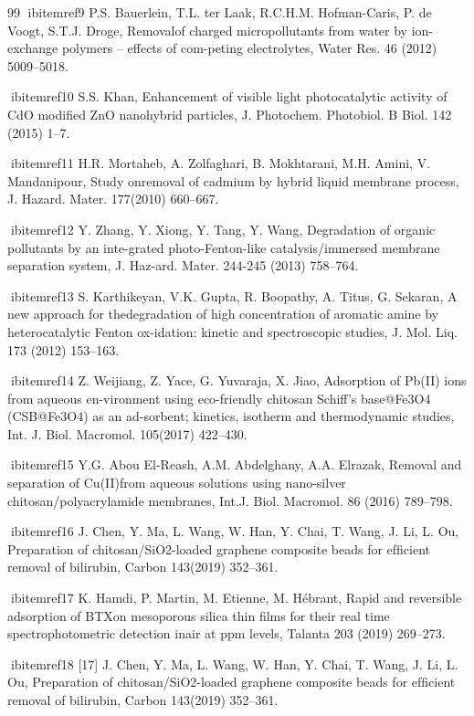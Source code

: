 \documentclass[final,5p,times,twocolumn,authoryear]{elsarticle}
\begin{document}
\begin{thebibliography}{99}
ibitem{ref9} P.S. Bauerlein, T.L. ter Laak, R.C.H.M. Hofman-Caris, P. de Voogt, S.T.J. Droge, Removalof charged micropollutants from water by ion-exchange polymers – effects of com-peting electrolytes, Water Res. 46 (2012) 5009–5018.

ibitem{ref10} S.S. Khan, Enhancement of visible light photocatalytic activity of CdO modiﬁed ZnO nanohybrid particles, J. Photochem. Photobiol. B Biol. 142 (2015) 1–7.

ibitem{ref11} H.R. Mortaheb, A. Zolfaghari, B. Mokhtarani, M.H. Amini, V. Mandanipour, Study onremoval of cadmium by hybrid liquid membrane process, J. Hazard. Mater. 177(2010) 660–667.

ibitem{ref12} Y. Zhang, Y. Xiong, Y. Tang, Y. Wang, Degradation of organic pollutants by an inte-grated photo-Fenton-like catalysis/immersed membrane separation system, J. Haz-ard. Mater. 244-245 (2013) 758–764.

ibitem{ref13} S. Karthikeyan, V.K. Gupta, R. Boopathy, A. Titus, G. Sekaran, A new approach for thedegradation of high concentration of aromatic amine by heterocatalytic Fenton ox-idation: kinetic and spectroscopic studies, J. Mol. Liq. 173 (2012) 153–163.

ibitem{ref14} Z. Weijiang, Z. Yace, G. Yuvaraja, X. Jiao, Adsorption of Pb(II) ions from aqueous en-vironment using eco-friendly chitosan Schiff’s base@Fe3O4 (CSB@Fe3O4) as an ad-sorbent; kinetics, isotherm and thermodynamic studies, Int. J. Biol. Macromol. 105(2017) 422–430.

ibitem{ref15} Y.G. Abou El-Reash, A.M. Abdelghany, A.A. Elrazak, Removal and separation of Cu(II)from aqueous solutions using nano-silver chitosan/polyacrylamide membranes, Int.J. Biol. Macromol. 86 (2016) 789–798.

ibitem{ref16} J. Chen, Y. Ma, L. Wang, W. Han, Y. Chai, T. Wang, J. Li, L. Ou, Preparation of chitosan/SiO2-loaded graphene composite beads for efﬁcient removal of bilirubin, Carbon 143(2019) 352–361.

ibitem{ref17} K. Hamdi, P. Martin, M. Etienne, M. Hébrant, Rapid and reversible adsorption of BTXon mesoporous silica thin ﬁlms for their real time spectrophotometric detection inair at ppm levels, Talanta 203 (2019) 269–273.

ibitem{ref18} [17] J. Chen, Y. Ma, L. Wang, W. Han, Y. Chai, T. Wang, J. Li, L. Ou, Preparation of chitosan/SiO2-loaded graphene composite beads for efﬁcient removal of bilirubin, Carbon 143(2019) 352–361.


\end{thebibliography}
\end{document}
